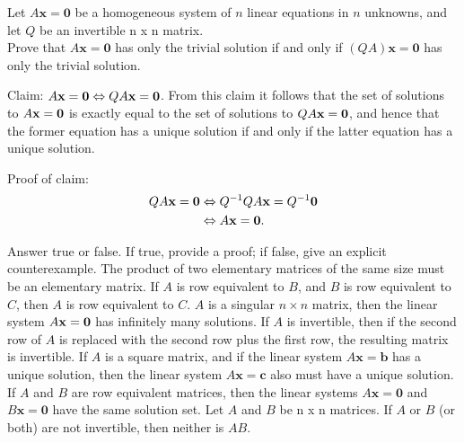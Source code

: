 \ii Let $A\textbf{x}=\textbf{0}$ be a homogeneous system of $n$ linear equations in $n$ unknowns, and let $Q$ be an invertible n x n matrix.\\ 
Prove that $A\textbf{x}=\textbf{0}$ has only the trivial solution if and only if $(QA)\textbf{x}=\textbf{0}$ has only the trivial solution.
\\
\begin{solution} 
Claim: $A{\mathbf x}={\mathbf 0}\Leftrightarrow QA{\mathbf x}={\mathbf 0}$. From this claim it follows that the set of solutions to $A{\mathbf x}={\mathbf 0}$ is exactly equal to the set of solutions to $QA{\mathbf x}={\mathbf 0}$, and hence that the former equation has a unique solution if and only if the latter equation has a unique solution.

Proof of claim:
\begin{align*}
QA{\mathbf x}={\mathbf 0}&\Leftrightarrow Q^{-1}QA{\mathbf x}=Q^{-1}{\mathbf 0}\\
&\Leftrightarrow A{\mathbf x}={\mathbf 0}.
\end{align*}
\end{solution}
\ii Answer true or false. If true, provide a proof; if false, give an explicit counterexample. 
\bb
\ii The product of two elementary matrices of the same size must be an elementary matrix.
\ii If $A$ is row equivalent to $B$, and $B$ is row equivalent to $C$, then $A$ is row equivalent to $C$. 
\ii $A$ is a singular $n\times n$ matrix, then the linear system $A{\mathbf x}={\mathbf 0}$ has infinitely many solutions. 
\ii If $A$ is invertible, then if the second row of $A$ is replaced with the second row plus the first row, the resulting matrix is invertible. 
\ii If $A$ is a square matrix, and if the linear system $A\textbf{x} = \textbf{b}$ has a unique solution, then the linear system $A\textbf{x} = \textbf{c}$ also must have a unique solution.
\ii If $A$ and $B$ are row equivalent matrices, then the linear systems $A\textbf{x}=\textbf{0}$ and $B\textbf{x}=\textbf{0}$ have the same solution set.
\ii Let $A$ and $B$ be n x n matrices. If $A$ or $B$ (or both) are not invertible, then neither is $AB$.
\ee
